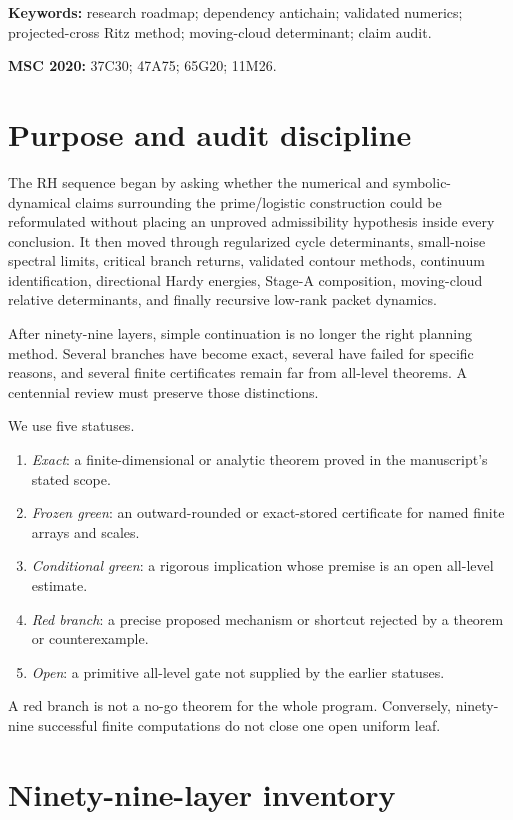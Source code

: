 \documentclass[11pt]{article}
\theoremstyle{definition}
\theoremstyle{remark}
\begin{document}
\noindent\textbf{Keywords:} research roadmap; dependency antichain; validated
numerics; projected-cross Ritz method; moving-cloud determinant; claim audit.

\medskip
\noindent\textbf{MSC 2020:} 37C30; 47A75; 65G20; 11M26.

\section{Purpose and audit discipline}

The RH sequence began by asking whether the numerical and symbolic-dynamical
claims surrounding the prime/logistic construction could be reformulated
without placing an unproved admissibility hypothesis inside every conclusion.
It then moved through regularized cycle determinants, small-noise spectral
limits, critical branch returns, validated contour methods, continuum
identification, directional Hardy energies, Stage-A composition, moving-cloud
relative determinants, and finally recursive low-rank packet dynamics.

After ninety-nine layers, simple continuation is no longer the right
planning method.  Several branches have become exact, several have failed for
specific reasons, and several finite certificates remain far from all-level
theorems.  A centennial review must preserve those distinctions.

We use five statuses.
\begin{enumerate}[leftmargin=2em]
\item \emph{Exact}: a finite-dimensional or analytic theorem proved in the
manuscript's stated scope.
\item \emph{Frozen green}: an outward-rounded or exact-stored certificate for
named finite arrays and scales.
\item \emph{Conditional green}: a rigorous implication whose premise is an
open all-level estimate.
\item \emph{Red branch}: a precise proposed mechanism or shortcut rejected by
a theorem or counterexample.
\item \emph{Open}: a primitive all-level gate not supplied by the earlier
statuses.
\end{enumerate}
A red branch is not a no-go theorem for the whole program.  Conversely,
ninety-nine successful finite computations do not close one open uniform
leaf.

\section{Ninety-nine-layer inventory}
\label{sec:inventory}
\end{document}
